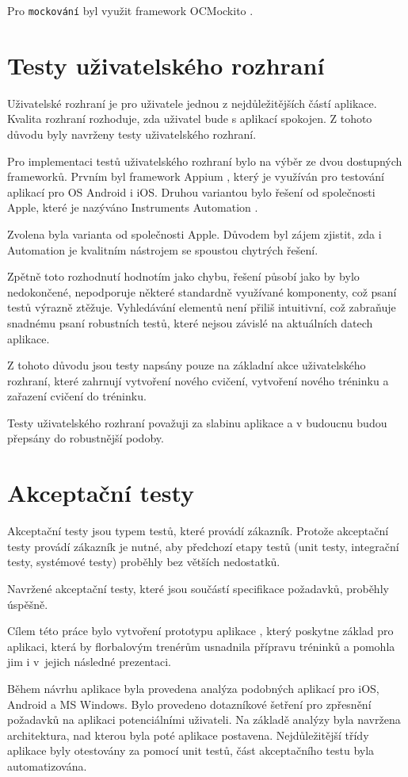 \documentclass[thesis=B,czech]{FITthesis}[2012/06/26]
\begin{document}
	Pro \texttt{mockování} byl využit framework OCMockito \cite{mockitoOnline}.

\section{Testy uživatelského rozhraní}

	Uživatelské rozhraní je pro uživatele jednou z nejdůležitějších částí aplikace. Kvalita rozhraní rozhoduje, zda uživatel bude s aplikací spokojen. Z tohoto důvodu byly navrženy testy uživatelského rozhraní.

	Pro implementaci testů uživatelského rozhraní bylo na výběr ze dvou dostupných frameworků. Prvním byl framework Appium \cite{appiumOnline}, který je využíván pro testování aplikací pro OS Android i iOS. Druhou variantou bylo řešení od společnosti Apple, které je nazýváno Instruments Automation \cite{automationOnline}.

	Zvolena byla varianta od společnosti Apple. Důvodem byl zájem zjistit, zda i Automation je kvalitním nástrojem se spoustou chytrých řešení.

	Zpětně toto rozhodnutí hodnotím jako chybu, řešení působí jako by bylo nedokončené, nepodporuje některé standardně využívané komponenty, což psaní testů výrazně ztěžuje. Vyhledávání elementů není přiliš intuitivní, což zabraňuje snadnému psaní robustních testů, které nejsou závislé na aktuálních datech aplikace.

	Z tohoto důvodu jsou testy napsány pouze na základní akce uživatelského rozhraní, které zahrnují vytvoření nového cvičení, vytvoření nového tréninku a zařazení cvičení do tréninku.

	Testy uživatelského rozhraní považuji za slabinu aplikace a v budoucnu budou přepsány do robustnější podoby.

\section{Akceptační testy}

	Akceptační testy jsou typem testů, které provádí zákazník. Protože akceptační testy provádí zákazník je nutné, aby předchozí etapy testů (unit testy, integrační testy, systémové testy) proběhly bez větších nedostatků.

	Navržené akceptační testy, které jsou součástí specifikace požadavků, proběhly úspěšně.

\begin{conclusion}
	Cílem této práce bylo vytvoření prototypu aplikace , který poskytne základ pro aplikaci, která by florbalovým trenérům usnadnila přípravu tréninků a pomohla jim i v~jejich následné prezentaci.

	Během návrhu aplikace byla provedena analýza podobných aplikací pro iOS, Android a MS Windows. Bylo provedeno dotazníkové šetření pro zpřesnění požadavků na aplikaci potenciálními uživateli. Na základě analýzy byla navržena architektura, nad kterou byla poté aplikace postavena. Nejdůležitější třídy aplikace byly otestovány za pomocí unit testů, část akceptačního testu byla automatizována.

\end{conclusion}
\end{document}
